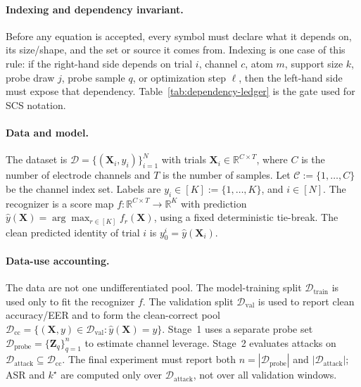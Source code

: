 \documentclass[11pt]{article}
\begin{document}
\paragraph{Indexing and dependency invariant.}
Before any equation is accepted, every symbol must declare what it depends on, its
size/shape, and the set or source it comes from. Indexing is one case of this rule: if the
right-hand side depends on trial $i$, channel $c$, atom $m$, support size $k$, probe draw
$j$, probe sample $q$, or optimization step $\ell$, then the left-hand side must expose
that dependency. Table~\ref{tab:dependency-ledger} is the gate used for SCS notation.

\paragraph{Data and model.}
The dataset is $\mathcal{D}=\{(\mathbf{X}_i,y_i)\}_{i=1}^N$ with trials
$\mathbf{X}_i\in\mathbb{R}^{C\times T}$, where $C$ is the number of electrode channels
and $T$ is the number of samples. Let $\mathcal{C}:=\{1,\dots,C\}$ be the channel index
set. Labels are $y_i\in[K]:=\{1,\dots,K\}$, and $i\in[N]$. The recognizer is a score map
$f:\mathbb{R}^{C\times T}\to\mathbb{R}^{K}$ with prediction
$\hat{y}(\mathbf{X})=\arg\max_{r\in[K]} f_r(\mathbf{X})$, using a fixed deterministic
tie-break. The clean predicted identity of trial $i$ is $y_0^i=\hat{y}(\mathbf{X}_i)$.

\paragraph{Data-use accounting.}
The data are not one undifferentiated pool. The model-training split
$\mathcal{D}_{\mathrm{train}}$ is used only to fit the recognizer $f$. The validation
split $\mathcal{D}_{\mathrm{val}}$ is used to report clean accuracy/EER and to form the
clean-correct pool
$\mathcal{D}_{\mathrm{cc}}=\{(\mathbf{X},y)\in\mathcal{D}_{\mathrm{val}}:
\hat y(\mathbf{X})=y\}$. Stage~1 uses a separate probe set
$\mathcal{D}_{\mathrm{probe}}=\{\mathbf{Z}_q\}_{q=1}^{n}$ to estimate channel leverage.
Stage~2 evaluates attacks on
$\mathcal{D}_{\mathrm{attack}}\subseteq\mathcal{D}_{\mathrm{cc}}$. The final experiment
must report both $n=|\mathcal{D}_{\mathrm{probe}}|$ and
$|\mathcal{D}_{\mathrm{attack}}|$; ASR and $k^\star$ are computed only over
$\mathcal{D}_{\mathrm{attack}}$, not over all validation windows.
\end{document}
